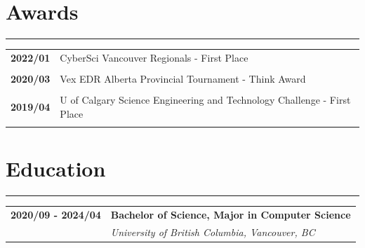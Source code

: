 \documentclass[letterpaper]{article}
\newcommand{\sect}[1]{\section*{#1}
                        {\color{cyan}
                        \rule{\textwidth}{1pt}
                        \vspace{-1ex}}}
\begin{document}
    \sect{Awards}

        \begin{tabular}{p{} p{}} 
            \textbf{2022/01} & CyberSci Vancouver Regionals - First Place \\
            \\
            \textbf{2020/03} & Vex EDR Alberta Provincial Tournament - Think Award \\
            \\
            \textbf{2019/04} & U of Calgary Science Engineering and Technology Challenge - First Place \\
            \\
        \end{tabular}

    \sect{Education}

        \begin{tabular}{p{} p{}} 
            \textbf{2020/09 - 2024/04} & \large\textbf{Bachelor of Science, Major in Computer Science} \\
            & \emph{University of British Columbia, Vancouver, BC} \\
        \end{tabular}
\end{document}
